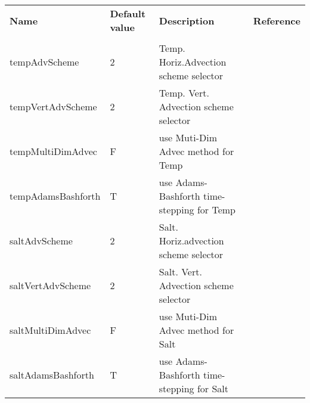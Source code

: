 \begin{table}
\begin{tabular}{lllc}

  \textbf{Name}  &  \textbf{Default value}  
    &  \textbf{Description}   &  \textbf{Reference}  \\
  & & & \\

   tempAdvScheme   &                         2
    &   Temp. Horiz.Advection scheme selector 
    &  %
    \\
   tempVertAdvScheme   &                         2
    &   Temp. Vert. Advection scheme selector 
    &  %
    \\
   tempMultiDimAdvec   &                     F
    &   use Muti-Dim Advec method for Temp 
    &  %
    \\
   tempAdamsBashforth   &                     T
    &   use Adams-Bashforth time-stepping for Temp 
    &  %
    \\
   saltAdvScheme   &                         2
    &   Salt. Horiz.advection scheme selector 
    &  %
    \\
   saltVertAdvScheme   &                         2
    &   Salt. Vert. Advection scheme selector 
    &  %
    \\
   saltMultiDimAdvec   &                     F
    &   use Muti-Dim Advec method for Salt 
    &  %
    \\
   saltAdamsBashforth   &                     T
    &   use Adams-Bashforth time-stepping for Salt 
    &  %
    \\

\end{tabular}
\end{table}

